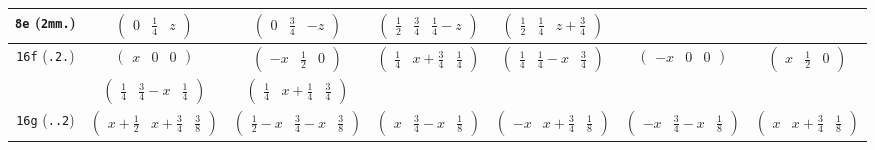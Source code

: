 \documentclass[fleqn,9pt,landscape]{jsarticle}
\begin{document}
\begin{center}
\begin{longtable}{ccccccc}
{\tt 8e} ({\tt 2mm.}) & $ \begin{pmatrix} 0 & \frac{1}{4} & z \end{pmatrix} $ & $ \begin{pmatrix} 0 & \frac{3}{4} & - z \end{pmatrix} $ & $ \begin{pmatrix} \frac{1}{2} & \frac{3}{4} & \frac{1}{4} - z \end{pmatrix} $ & $ \begin{pmatrix} \frac{1}{2} & \frac{1}{4} & z + \frac{3}{4} \end{pmatrix} $ & $  $ & $  $ \\ \hline
{\tt 16f} ({\tt .2.}) & $ \begin{pmatrix} x & 0 & 0 \end{pmatrix} $ & $ \begin{pmatrix} - x & \frac{1}{2} & 0 \end{pmatrix} $ & $ \begin{pmatrix} \frac{1}{4} & x + \frac{3}{4} & \frac{1}{4} \end{pmatrix} $ & $ \begin{pmatrix} \frac{1}{4} & \frac{1}{4} - x & \frac{3}{4} \end{pmatrix} $ & $ \begin{pmatrix} - x & 0 & 0 \end{pmatrix} $ & $ \begin{pmatrix} x & \frac{1}{2} & 0 \end{pmatrix} $ \\
& $ \begin{pmatrix} \frac{1}{4} & \frac{3}{4} - x & \frac{1}{4} \end{pmatrix} $ & $ \begin{pmatrix} \frac{1}{4} & x + \frac{1}{4} & \frac{3}{4} \end{pmatrix} $ & $  $ & $  $ & $  $ & $  $ \\ \hline
{\tt 16g} ({\tt ..2}) & $ \begin{pmatrix} x + \frac{1}{2} & x + \frac{3}{4} & \frac{3}{8} \end{pmatrix} $ & $ \begin{pmatrix} \frac{1}{2} - x & \frac{3}{4} - x & \frac{3}{8} \end{pmatrix} $ & $ \begin{pmatrix} x & \frac{3}{4} - x & \frac{1}{8} \end{pmatrix} $ & $ \begin{pmatrix} - x & x + \frac{3}{4} & \frac{1}{8} \end{pmatrix} $ & $ \begin{pmatrix} - x & \frac{3}{4} - x & \frac{1}{8} \end{pmatrix} $ & $ \begin{pmatrix} x & x + \frac{3}{4} & \frac{1}{8} \end{pmatrix} $ \\

\end{longtable}
\end{center}
\end{document}
